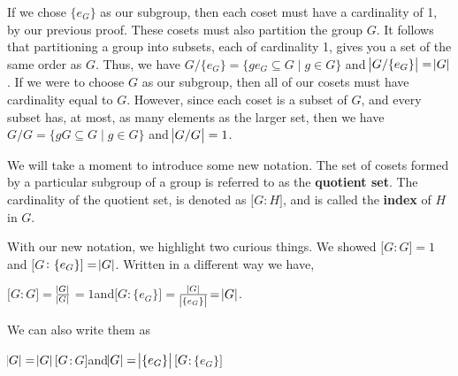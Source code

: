 \documentclass[12pt, a4paper]{article}
\begin{document}
    
    If we chose $\{e_G\}$ as our subgroup, then each coset must have a cardinality of 1, by our previous proof. These cosets must also partition the group $G$. It follows that partitioning a group into subsets, each of cardinality 1, gives you a set of the same order as $G$. Thus, we have $G/\{e_G\}=\{ge_G\subseteq G\mid g\in G\}$ and $\abs{G/\{e_G\}}=\abs{G}$. If we were to choose $G$ as our subgroup, then all of our cosets must have cardinality equal to $G$. However, since each coset is a subset of $G$, and every subset has, at most, as many elements as the larger set, then we have $G/G=\{gG\subseteq G\mid g\in G\}$ and $\abs{G/G}=1$.\par
    
    We will take a moment to introduce some new notation. The set of cosets formed by a particular subgroup of a group is referred to as the \textbf{quotient set}. The cardinality of the quotient set, is denoted as $[G$\hspace{1mm}$\colon H]$, and is called the \textbf{index} of $H$ in $G$. \par
    
    With our new notation, we highlight two curious things. We showed $[G$\hspace{1mm}$\colon G]=1$ and $[G$\hspace{1mm}$\colon\{e_G\}]=\abs{G}$. Written in a different way we have,\par
    
\vspace{4mm}

        \centerline{$[G$\hspace{1mm}$\colon G]=$\Large{$\frac{\abs{G}}{\abs{G}}$\normalsize$=1$}\normalsize\hspace{5mm}and\hspace{5mm}$[G$\hspace{1mm}$\colon\{e_G\}]=$\Large{$\frac{\abs{G}}{\abs{\{e_G\}}}$\normalsize$=\abs{G}$}.}
        
\begin{flushleft}

    We can also write them as

\end{flushleft}

        \centerline{$\abs{G}=\abs{G}[G$\hspace{1mm}$\colon G]$\hspace{5mm}and\hspace{5mm}$\abs{G}=\abs{\{e_G\}}[G$\hspace{1mm}$\colon \{e_G\}]$}
        
\end{document}

